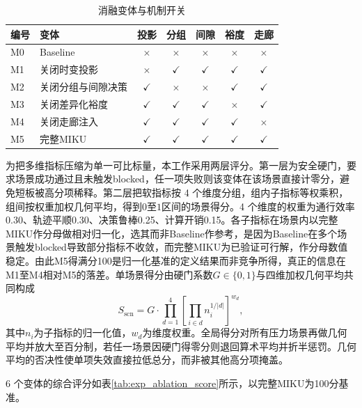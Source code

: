 \documentclass[a4paper,11pt]{ctexart}
\theoremstyle{definition}
\begin{document}
\begin{table}[htbp]
\centering
\caption{消融变体与机制开关}
\label{tab:exp_ablation_matrix}
\small
\begin{tabular}{llccccc}
\toprule
\textbf{编号} & \textbf{变体} & 投影 & 分组 & 间隙 & 裕度 & 走廊 \\
\midrule
M0 & Baseline             & $\times$    & $\times$    & $\times$    & $\times$    & $\times$    \\
M1 & 关闭时变投影         & $\times$    & $\checkmark$ & $\checkmark$ & $\checkmark$ & $\checkmark$ \\
M2 & 关闭分组与间隙决策   & $\checkmark$ & $\times$    & $\times$    & $\checkmark$ & $\checkmark$ \\
M3 & 关闭差异化裕度       & $\checkmark$ & $\checkmark$ & $\checkmark$ & $\times$    & $\checkmark$ \\
M4 & 关闭走廊注入         & $\checkmark$ & $\checkmark$ & $\checkmark$ & $\checkmark$ & $\times$    \\
M5 & 完整MIKU             & $\checkmark$ & $\checkmark$ & $\checkmark$ & $\checkmark$ & $\checkmark$ \\
\bottomrule
\end{tabular}
\end{table}

为把多维指标压缩为单一可比标量，本工作采用两层评分。第一层为安全硬门，要求场景成功通过且未触发blocked，任一项失败则该变体在该场景直接计零分，避免短板被高分项稀释。第二层把软指标按 4 个维度分组，组内子指标等权乘积，组间按权重加权几何平均，得到$0$至$1$区间的场景得分。4 个维度的权重为通行效率0.30、轨迹平顺0.30、决策鲁棒0.25、计算开销0.15。各子指标在场景内以完整MIKU作分母做相对归一化，选其而非Baseline作参考，是因为Baseline在多个场景触发blocked导致部分指标不收敛，而完整MIKU为已验证可行解，作分母数值稳定。由此M5得满分100是归一化基准的定义结果而非竞争所得，真正的信息在M1至M4相对M5的落差。单场景得分由硬门系数$G \in \{0, 1\}$与四维加权几何平均共同构成
\begin{equation}
S_{\mathrm{scn}} = G \cdot \prod_{d=1}^{4} \left[ \prod_{i \in d} n_i^{1/|d|} \right]^{w_d},
\label{eq:exp_score_scn}
\end{equation}
其中$n_i$为子指标的归一化值，$w_d$为维度权重。全局得分对所有压力场景再做几何平均并放大至百分制，若任一场景因硬门得零分则退回算术平均并折半惩罚。几何平均的否决性使单项失效直接拉低总分，而非被其他高分项掩盖。

6 个变体的综合评分如表\ref{tab:exp_ablation_score}所示，以完整MIKU为100分基准。
\end{document}
